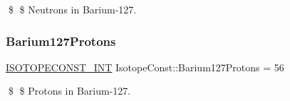 \$ \$ Neutrons in Barium-\/127. \mbox{\label{group___isotope_const-_barium-_ba127_ga124b4d4b54d95b51543867dfb092ead2}} 
\subsubsection{\texorpdfstring{Barium127\+Protons}{Barium127Protons}}
{\footnotesize\ttfamily \mbox{\hyperlink{group___isotope_const-_macros_ga5f18360b3e99483a35c32d789e62621c}{I\+S\+O\+T\+O\+P\+E\+C\+O\+N\+S\+T\+\_\+\+I\+NT}} Isotope\+Const\+::\+Barium127\+Protons = 56}

\$ \$ Protons in Barium-\/127. 